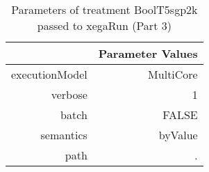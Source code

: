 \begin{table}[ht]
\centering
\begin{tabular}{rr}
  \hline
 & Parameter Values \\ 
  \hline
executionModel & MultiCore \\ 
  verbose & 1 \\ 
  batch & FALSE \\ 
  semantics & byValue \\ 
  path & . \\ 
   \hline
\end{tabular}
\caption{ Parameters of treatment BoolT5sgp2k passed to xegaRun
 (Part 3)} 
\end{table}

